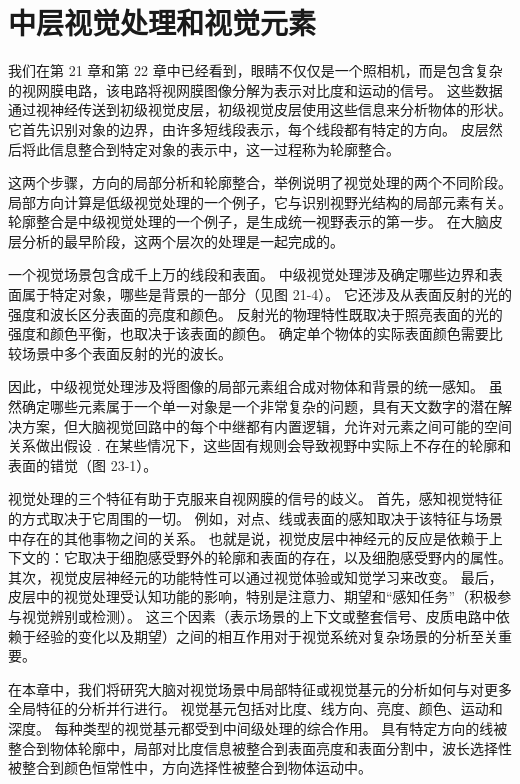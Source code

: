\chapter{中层视觉处理和视觉元素}
我们在第 21 章和第 22 章中已经看到，眼睛不仅仅是一个照相机，而是包含复杂的视网膜电路，该电路将视网膜图像分解为表示对比度和运动的信号。 这些数据通过视神经传送到初级视觉皮层，初级视觉皮层使用这些信息来分析物体的形状。 它首先识别对象的边界，由许多短线段表示，每个线段都有特定的方向。 皮层然后将此信息整合到特定对象的表示中，这一过程称为轮廓整合。

这两个步骤，方向的局部分析和轮廓整合，举例说明了视觉处理的两个不同阶段。 局部方向计算是低级视觉处理的一个例子，它与识别视野光结构的局部元素有关。 轮廓整合是中级视觉处理的一个例子，是生成统一视野表示的第一步。 在大脑皮层分析的最早阶段，这两个层次的处理是一起完成的。

一个视觉场景包含成千上万的线段和表面。 中级视觉处理涉及确定哪些边界和表面属于特定对象，哪些是背景的一部分（见图 21-4）。 它还涉及从表面反射的光的强度和波长区分表面的亮度和颜色。 反射光的物理特性既取决于照亮表面的光的强度和颜色平衡，也取决于该表面的颜色。 确定单个物体的实际表面颜色需要比较场景中多个表面反射的光的波长。

因此，中级视觉处理涉及将图像的局部元素组合成对物体和背景的统一感知。 虽然确定哪些元素属于一个单一对象是一个非常复杂的问题，具有天文数字的潜在解决方案，但大脑视觉回路中的每个中继都有内置逻辑，允许对元素之间可能的空间关系做出假设 . 在某些情况下，这些固有规则会导致视野中实际上不存在的轮廓和表面的错觉（图 23-1）。

视觉处理的三个特征有助于克服来自视网膜的信号的歧义。 首先，感知视觉特征的方式取决于它周围的一切。 例如，对点、线或表面的感知取决于该特征与场景中存在的其他事物之间的关系。 也就是说，视觉皮层中神经元的反应是依赖于上下文的：它取决于细胞感受野外的轮廓和表面的存在，以及细胞感受野内的属性。 其次，视觉皮层神经元的功能特性可以通过视觉体验或知觉学习来改变。 最后，皮层中的视觉处理受认知功能的影响，特别是注意力、期望和“感知任务”（积极参与视觉辨别或检测）。 这三个因素（表示场景的上下文或整套信号、皮质电路中依赖于经验的变化以及期望）之间的相互作用对于视觉系统对复杂场景的分析至关重要。

在本章中，我们将研究大脑对视觉场景中局部特征或视觉基元的分析如何与对更多全局特征的分析并行进行。 视觉基元包括对比度、线方向、亮度、颜色、运动和深度。 每种类型的视觉基元都受到中间级处理的综合作用。 具有特定方向的线被整合到物体轮廓中，局部对比度信息被整合到表面亮度和表面分割中，波长选择性被整合到颜色恒常性中，方向选择性被整合到物体运动中。


